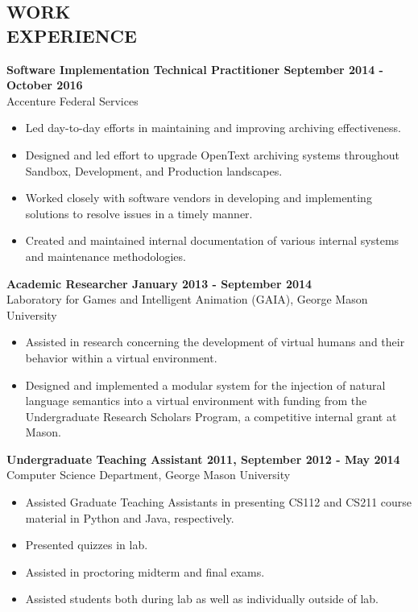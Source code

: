 \documentclass[line, margin]{res}
\begin{document}
\begin{resume}
\section{WORK \\ EXPERIENCE}
    \textbf{Software Implementation Technical Practitioner \hfill September 2014 - \\\hspace*{\fill}October 2016\hspace*{8px}}\\
    Accenture Federal Services
    \begin{itemize}  \itemsep -2pt %
        \item Led day-to-day efforts in maintaining and improving archiving effectiveness.
        \item Designed and led effort to upgrade OpenText archiving systems throughout Sandbox, Development, and Production landscapes.
        \item Worked closely with software vendors in developing and implementing solutions to resolve issues in a timely manner.
        \item Created and maintained internal documentation of various internal systems and maintenance methodologies.
    \end{itemize}
	\textbf{Academic Researcher \hfill January 2013 - September 2014} \\
	Laboratory for Games and Intelligent Animation (GAIA), George Mason University
	\begin{itemize}  \itemsep -2pt %
		\item Assisted in research concerning the development of virtual humans and their behavior within a virtual environment.
		\item Designed and implemented a modular system for the injection of natural language semantics into a virtual environment with funding from the Undergraduate Research Scholars Program, a competitive internal grant at Mason.
	\end{itemize}
	\textbf{Undergraduate Teaching Assistant \hfill 2011, September 2012 - May 2014} \\
	Computer Science Department, George Mason University
	\begin{itemize}  \itemsep -2pt %
		\item Assisted Graduate Teaching Assistants in presenting CS112 and CS211 course material in Python and Java, respectively.
		\item Presented quizzes in lab.
		\item Assisted in proctoring midterm and final exams.
		\item Assisted students both during lab as well as individually outside of lab.
	\end{itemize}


\end{resume}
\end{document}
